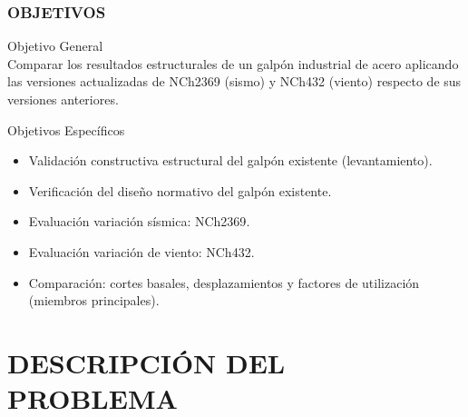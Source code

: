 \documentclass[11.5pt,aspectratio=169,handout]{beamer}
\newcommand{\ctitle}[1]{\frametitle{#1}}
\begin{document}
\begin{frame}
\ctitle{OBJETIVOS}
\vspace{-1mm}
{\footnotesize\alert{Objetivo General}}\\[1mm]
\footnotesize\justifying
Comparar los resultados estructurales de un galpón industrial de acero
aplicando las versiones actualizadas de \alert{NCh2369} (sismo) y
\alert{NCh432} (viento) respecto de sus versiones anteriores.

\vspace{2.5mm}
{\footnotesize\alert{Objetivos Específicos}}\\[1mm]
\begin{itemize}\footnotesize\setlength{\itemsep}{1mm}\setlength{\parsep}{0pt}
  \item Validación constructiva estructural del galpón existente
        (levantamiento).
  \item Verificación del diseño normativo del galpón existente.
  \item Evaluación variación sísmica: \alert{NCh2369}.
  \item Evaluación variación de viento: \alert{NCh432}.
  \item Comparación: cortes basales, desplazamientos y factores de
        utilización (miembros principales).
\end{itemize}
\end{frame}

\section{DESCRIPCIÓN DEL PROBLEMA}
\end{document}
